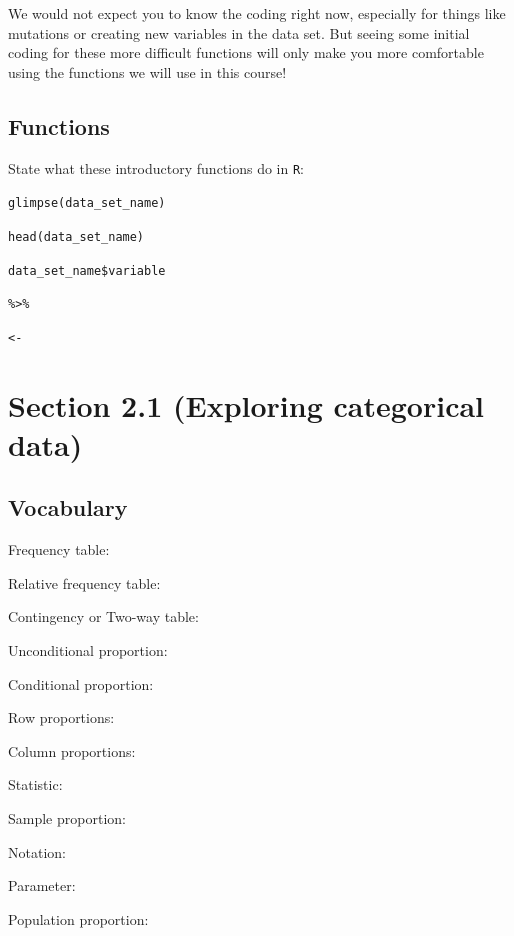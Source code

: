 \documentclass[
]{report}
\newcommand{\rgs}{\vspace{12pt}} %
\newcommand{\rgi}{\hspace{24pt}}  %
\begin{document}
We would not expect you to know the coding right now, especially for things like mutations or creating new variables in the data set. But seeing some initial coding for these more difficult functions will only make you more comfortable using the functions we will use in this course!

\hypertarget{functions}{%
\subsection*{Functions}\label{functions}}

State what these introductory functions do in \texttt{R}:

\texttt{glimpse(data\_set\_name)}

\texttt{head(data\_set\_name)}

\texttt{data\_set\_name\$variable}

\texttt{\%\textgreater{}\%}

\texttt{\textless{}-}

\hypertarget{section-2.1-exploring-categorical-data}{%
\section*{Section 2.1 (Exploring categorical data)}\label{section-2.1-exploring-categorical-data}}

\hypertarget{vocabulary}{%
\subsection*{Vocabulary}\label{vocabulary}}

Frequency table:
\rgs

Relative frequency table:
\rgs

Contingency or Two-way table:
\rgs

Unconditional proportion:
\rgs

Conditional proportion:
\rgs

\rgi Row proportions:
\rgs

\rgi Column proportions:
\rgs

Statistic:
\rgs

\rgi Sample proportion:
\rgs

\rgi \rgi Notation:
\rgs

Parameter:
\rgs

\rgi Population proportion:
\rgs
\end{document}
